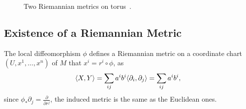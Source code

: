 \begin{figure}[htp]
    \centering
    \caption{Two Riemannian metrics on torus~\cite[p.~6]{tu2010introduction}.}
\end{figure}
\subsection{Existence of a Riemannian Metric}
The local diffeomorphism $\phi$ defines a Riemannian metric on 
a coordinate chart $(U, x^1,\dots, x^n)$ of $M$ that $x^i=r^i \circ \phi$, 
as
\begin{equation}
    \langle X, Y \rangle=\sum_{ij}a^i b^i\langle \partial_i, \partial_j \rangle
    =\sum_{ij}a^i b^i,
    \label{eq. induced inner}
\end{equation}
since $\phi_* \partial_j=\frac{\partial}{\partial r^j}$, the induced metric 
is the same as the Euclidean ones.

